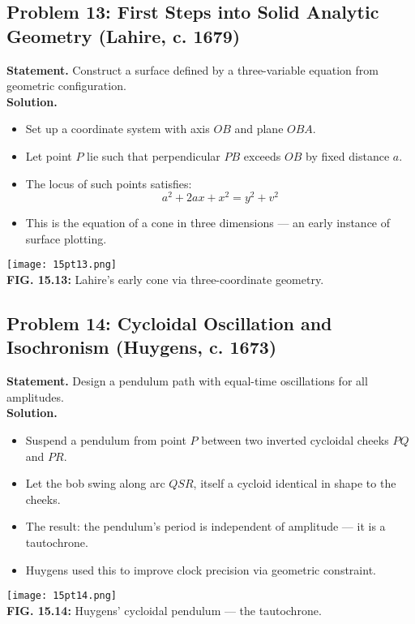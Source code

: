 \documentclass[9pt]{article}
\begin{document}
\newpage

\subsection*{Problem 13: First Steps into Solid Analytic Geometry (Lahire, c. 1679)}
\textbf{Statement.} Construct a surface defined by a three-variable equation from geometric configuration. \\
\textbf{Solution.}
\begin{itemize}
  \item Set up a coordinate system with axis \( OB \) and plane \( OBA \).
  \item Let point \( P \) lie such that perpendicular \( PB \) exceeds \( OB \) by fixed distance \( a \).
  \item The locus of such points satisfies:
  \[
    a^2 + 2ax + x^2 = y^2 + v^2
  \]
  \item This is the equation of a cone in three dimensions — an early instance of surface plotting.
\end{itemize}
\begin{center}
\texttt{[image: 15pt13.png]} \\
\textbf{FIG. 15.13:} Lahire’s early cone via three-coordinate geometry.
\end{center}

\newpage

\subsection*{Problem 14: Cycloidal Oscillation and Isochronism (Huygens, c. 1673)}
\textbf{Statement.} Design a pendulum path with equal-time oscillations for all amplitudes. \\
\textbf{Solution.}
\begin{itemize}
  \item Suspend a pendulum from point \( P \) between two inverted cycloidal cheeks \( PQ \) and \( PR \).
  \item Let the bob swing along arc \( QSR \), itself a cycloid identical in shape to the cheeks.
  \item The result: the pendulum’s period is independent of amplitude — it is a tautochrone.
  \item Huygens used this to improve clock precision via geometric constraint.
\end{itemize}
\begin{center}
\texttt{[image: 15pt14.png]} \\
\textbf{FIG. 15.14:} Huygens’ cycloidal pendulum — the tautochrone.
\end{center}
\end{document}
